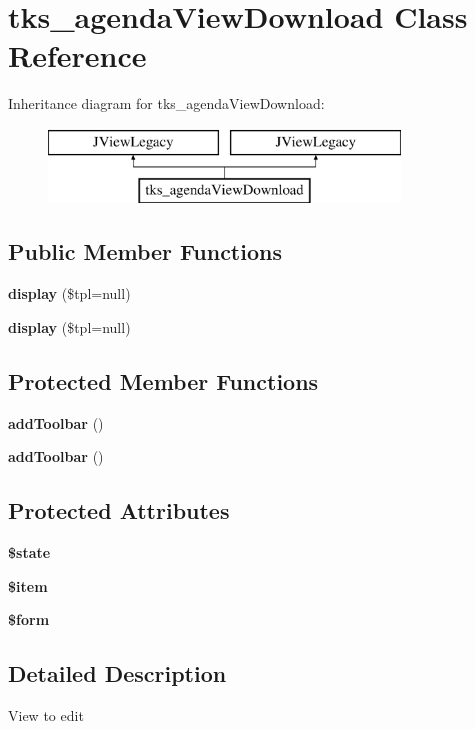 \section{tks\+\_\+agenda\+View\+Download Class Reference}
\label{classtks__agenda_view_download}
Inheritance diagram for tks\+\_\+agenda\+View\+Download\+:\begin{figure}[H]
\begin{center}
\leavevmode
\includegraphics[height=2.000000cm]{classtks__agenda_view_download}
\end{center}
\end{figure}
\subsection*{Public Member Functions}
\begin{DoxyCompactItemize}
\item 
\textbf{ display} (\$tpl=null)
\item 
\textbf{ display} (\$tpl=null)
\end{DoxyCompactItemize}
\subsection*{Protected Member Functions}
\begin{DoxyCompactItemize}
\item 
\textbf{ add\+Toolbar} ()
\item 
\textbf{ add\+Toolbar} ()
\end{DoxyCompactItemize}
\subsection*{Protected Attributes}
\begin{DoxyCompactItemize}
\item 
\textbf{ \$state}
\item 
\textbf{ \$item}
\item 
\textbf{ \$form}
\end{DoxyCompactItemize}


\subsection{Detailed Description}
View to edit

